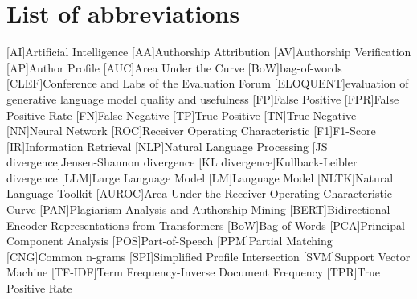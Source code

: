 \chapter*{List of abbreviations}

\begin{acronym}[XXXXXXXXX]
    [AI]{Artificial Intelligence}
    [AA]{Authorship Attribution}
    [AV]{Authorship Verification}
    [AP]{Author Profile}
    [AUC]{Area Under the Curve}
    [BoW]{bag-of-words}
    [CLEF]{Conference and Labs of the Evaluation Forum}
    [ELOQUENT]{evaluation of generative language model quality and usefulness}
    [FP]{False Positive}
    [FPR]{False Positive Rate}
    [FN]{False Negative}
    [TP]{True Positive}
    [TN]{True Negative}
    [NN]{Neural Network}
    [ROC]{Receiver Operating Characteristic}
    [F1]{F1-Score}
    [IR]{Information Retrieval}
    [NLP]{Natural Language Processing}
    [JS divergence]{Jensen-Shannon divergence}
    [KL divergence]{Kullback-Leibler divergence}
    [LLM]{Large Language Model}
    [LM]{Language Model}
    [NLTK]{Natural Language Toolkit}
    [AUROC]{Area Under the Receiver Operating Characteristic Curve}
    [PAN]{Plagiarism Analysis and Authorship Mining} %
    [BERT]{Bidirectional Encoder Representations from Transformers}
    [BoW]{Bag-of-Words}
    [PCA]{Principal Component Analysis}
    [POS]{Part-of-Speech}
    [PPM]{Partial Matching}
    [CNG]{Common n-grams}
    [SPI]{Simplified Profile Intersection}
    [SVM]{Support Vector Machine}
    [TF-IDF]{Term Frequency-Inverse Document Frequency}
    [TPR]{True Positive Rate}

\end{acronym}
